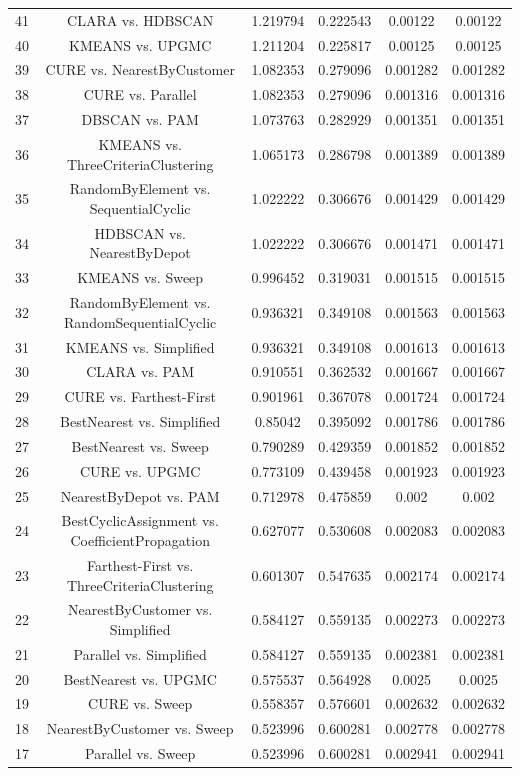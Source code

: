 \documentclass[a4paper,10pt]{article}
\begin{document}
\begin{landscape}
\begin{table}[!htp]
\begin{tabular}{cccccc}
41&CLARA vs. HDBSCAN&1.219794&0.222543&0.00122&0.00122\\
40&KMEANS vs. UPGMC&1.211204&0.225817&0.00125&0.00125\\
39&CURE vs. NearestByCustomer&1.082353&0.279096&0.001282&0.001282\\
38&CURE vs. Parallel&1.082353&0.279096&0.001316&0.001316\\
37&DBSCAN vs. PAM&1.073763&0.282929&0.001351&0.001351\\
36&KMEANS vs. ThreeCriteriaClustering&1.065173&0.286798&0.001389&0.001389\\
35&RandomByElement vs. SequentialCyclic&1.022222&0.306676&0.001429&0.001429\\
34&HDBSCAN vs. NearestByDepot&1.022222&0.306676&0.001471&0.001471\\
33&KMEANS vs. Sweep&0.996452&0.319031&0.001515&0.001515\\
32&RandomByElement vs. RandomSequentialCyclic&0.936321&0.349108&0.001563&0.001563\\
31&KMEANS vs. Simplified&0.936321&0.349108&0.001613&0.001613\\
30&CLARA vs. PAM&0.910551&0.362532&0.001667&0.001667\\
29&CURE vs. Farthest-First&0.901961&0.367078&0.001724&0.001724\\
28&BestNearest vs. Simplified&0.85042&0.395092&0.001786&0.001786\\
27&BestNearest vs. Sweep&0.790289&0.429359&0.001852&0.001852\\
26&CURE vs. UPGMC&0.773109&0.439458&0.001923&0.001923\\
25&NearestByDepot vs. PAM&0.712978&0.475859&0.002&0.002\\
24&BestCyclicAssignment vs. CoefficientPropagation&0.627077&0.530608&0.002083&0.002083\\
23&Farthest-First vs. ThreeCriteriaClustering&0.601307&0.547635&0.002174&0.002174\\
22&NearestByCustomer vs. Simplified&0.584127&0.559135&0.002273&0.002273\\
21&Parallel vs. Simplified&0.584127&0.559135&0.002381&0.002381\\
20&BestNearest vs. UPGMC&0.575537&0.564928&0.0025&0.0025\\
19&CURE vs. Sweep&0.558357&0.576601&0.002632&0.002632\\
18&NearestByCustomer vs. Sweep&0.523996&0.600281&0.002778&0.002778\\
17&Parallel vs. Sweep&0.523996&0.600281&0.002941&0.002941\\

\end{tabular}
\end{table}
\end{landscape}
\end{document}
